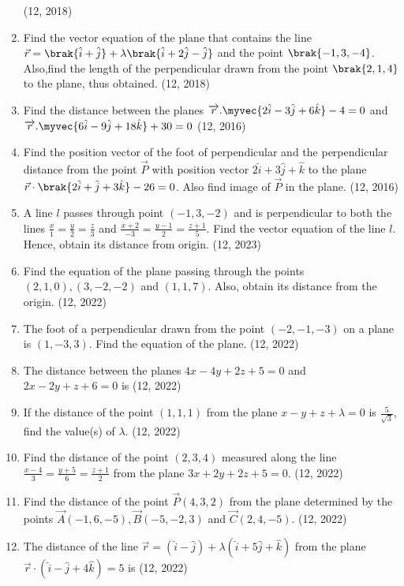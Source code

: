 \begin{enumerate}[label=\thesubsection.\arabic*, ref=\thesubsection.\theenumi]
\hfill (12, 2018)
\item Find the vector equation of the plane that contains the line $\vec{r}=\brak{\hat{i}+\hat{j}}+\lambda \brak{\hat{i}+2\hat{j} - \hat{j}}$ and the point $\brak{-1,3,-4}$. Also,find the length of the perpendicular drawn from the point $\brak{2,1,4}$ to the plane, thus obtained.
\hfill (12, 2018) 
\item Find the distance between the planes
      $    \overrightarrow{r}.\myvec{2\hat{i}-3\hat{j}+6\hat{k} } - 4 =0$
      and
        $  \overrightarrow{r}.\myvec{6\hat{i}-9\hat{j} +18\hat{k}} +30 =0$
      \hfill (12, 2016)
\item Find the position vector of the foot of perpendicular and the perpendicular distance from the point $\vec{P}$ with position vector $2\hat{i}+3\hat{j}+\hat{k}$ to the plane
 $         \vec{r}\cdot\brak{2\hat{i}+\hat{j}+3\hat{k}} - 26=0$.
      Also find image of $\vec{P}$ in the plane. \hfill (12, 2016)
\item A line $l$ passes through point $(-1,3,-2)$ and is perpendicular to both the lines $\frac {x}{1}=\frac{y}{2}=\frac{z}{3}$ and $\frac {x+2}{-3}=\frac{y-1}{2}=\frac{z+1}{5}$. Find the vector equation of the line $l$. Hence, obtain its distance from origin. \hfill (12, 2023)
\item Find the equation of the plane passing through the points $(2,1,0),(3,-2,-2)$ and $(1,1,7)$. Also, obtain its distance from the origin. \hfill (12, 2022)

\item The foot of a perpendicular drawn from the point $(-2,-1,-3)$ on a plane is $(1,-3,3)$. Find the equation of the plane. \hfill (12, 2022)
\item The distance between the planes $4x-4y+2z+5=0$ and $2x-2y+z+6=0$ is
\hfill (12, 2022)
\item If the distance of the point $(1,1,1)$ from the plane $x-y+z+\lambda=0$ is $\frac{5}{\sqrt{3}}$, find the value(s) of $\lambda$. \hfill (12, 2022)

\item Find the distance of the point $(2,3,4)$ measured along the line $\frac{x-4}{3}=\frac{y+5}{6}=\frac{z+1}{2}$ from the plane $3x+2y+2z+5=0$. \hfill (12, 2022)

\item Find the distance of the point $\vec{P}(4,3,2)$ from the plane determined by the points $\vec{A}(-1,6,-5),\vec{B}(-5,-2,3)$ and $\vec{C}(2,4,-5)$. \hfill (12, 2022)

\item The distance of the line
	$	\vec{r}=(\hat{i}-\hat{j})+\lambda(\hat{i}+5\hat{j}+\hat{k})$
	from the plane
		$\vec{r}\cdot(\hat{i}-\hat{j}+4\hat{k})=5$
	is
\hfill (12, 2022)


\end{enumerate}
